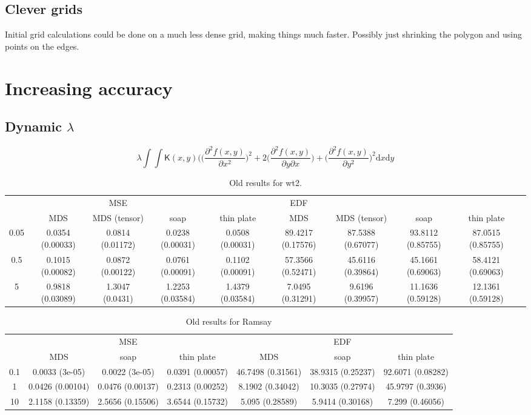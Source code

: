 \documentclass[a4paper,10pt]{article}
\begin{document}
\subsection{Clever grids}

Initial grid calculations could be done on a much less dense grid, making things much faster. Possibly just shrinking the polygon and using points on the edges.


\section{Increasing accuracy}

\subsection{Dynamic $\lambda$}


\begin{equation}
\lambda \int\int \mathsf{K}(x,y) \Big( \Big(\frac{\partial^2 f(x,y)}{\partial x^2}\Big)^2 + 2\Big(\frac{\partial^2 f(x,y)}{\partial y \partial x}\Big) + \Big(\frac{\partial^2 f(x,y)}{\partial y^2}\Big)^2 \text{d}x\text{d}y
\end{equation}


\begin{table}[ht]
\centering
\begin{tabular}{c c c c c c c c c c}
 & & MSE & &  & EDF & \\ 
 & MDS & MDS (tensor) & soap & thin plate & MDS & MDS (tensor) & soap & thin plate\\ 
0.05  & 0.0354 (0.00033) & 0.0814 (0.01172) & 0.0238 (0.00031) &0.0508 (0.00031) &89.4217 (0.17576) & 87.5388 (0.67077) & 93.8112 (0.85755) & 87.0515 (0.85755)\\ 
0.5  & 0.1015 (0.00082) & 0.0872 (0.00122) & 0.0761 (0.00091) &0.1102 (0.00091) &57.3566 (0.52471) & 45.6116 (0.39864) & 45.1661 (0.69063) & 58.4121 (0.69063)\\ 
5  & 0.9818 (0.03089) & 1.3047 (0.0431) & 1.2253 (0.03584) &1.4379 (0.03584) &7.0495 (0.31291) & 9.6196 (0.39957) & 11.1636 (0.59128) & 12.1361 (0.59128)\\ 
\end{tabular}
\caption{Old results for wt2.}
\end{table}


\begin{table}[ht]
\centering
\begin{tabular}{c c c c c c c}
 & & MSE & &  & EDF & \\ 
 & MDS & soap & thin plate & MDS & soap & thin plate\\ 
0.1  & 0.0033 (3e-05) & 0.0022 (3e-05) & 0.0391 (0.00057) &46.7498 (0.31561) & 38.9315 (0.25237) & 92.6071 (0.08282)\\ 
1  & 0.0426 (0.00104) & 0.0476 (0.00137) & 0.2313 (0.00252) &8.1902 (0.34042) & 10.3035 (0.27974) & 45.9797 (0.3936)\\ 
10  & 2.1158 (0.13359) & 2.5656 (0.15506) & 3.6544 (0.15732) &5.095 (0.28589) & 5.9414 (0.30168) & 7.299 (0.46056)\\ 
\end{tabular}
\caption{Old results for Ramsay}
\end{table}
\end{document}
